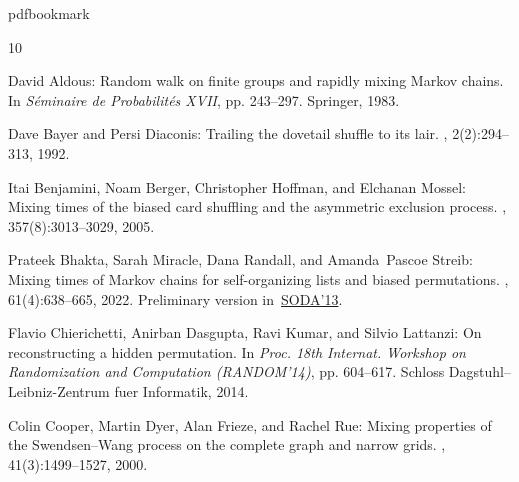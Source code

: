 \newcommand{\prelim}{Preliminary version in\ }\newcommand{\prelims}{Preliminary
  versions in\ }
\providecommand{\bibhead}[1]{}
\expandafter\ifx\csname pdfbookmark\endcsname\relax%
  \providecommand{\tocrefpdfbookmark}{}
\else\providecommand{\tocrefpdfbookmark}{%
   \hypertarget{tocreferences}{}%
   \pdfbookmark[1]{References}{tocreferences}}%
\fi

\tocrefpdfbookmark
\begin{thebibliography}{10}

\bibhead{ald}
{\sc David Aldous}: Random walk on finite groups and rapidly mixing {M}arkov
  chains.
\newblock In {\em S{\'e}minaire de Probabilit{\'e}s XVII}, pp. 243--297.
  Springer, 1983.

\bibhead{bd}
{\sc Dave Bayer and Persi Diaconis}: Trailing the dovetail shuffle to its lair.
, 2(2):294--313, 1992.

\bibhead{BBHM05}
{\sc Itai Benjamini, Noam Berger, Christopher Hoffman, and Elchanan Mossel}:
  Mixing times of the biased card shuffling and the asymmetric exclusion
  process.
, 357(8):3013--3029, 2005.
\newblock [\epfmtdoi{10.1090/S0002-9947-05-03610-X}]

\bibhead{bmrs}
{\sc Prateek Bhakta, Sarah Miracle, Dana Randall, and Amanda~Pascoe Streib}:
  Mixing times of {M}arkov chains for self-organizing lists and biased
  permutations.
, 61(4):638--665, 2022.
\newblock \prelim \href{https://doi.org/10.1137/1.9781611973105.1}{SODA'13}.

\bibhead{search}
{\sc Flavio Chierichetti, Anirban Dasgupta, Ravi Kumar, and Silvio Lattanzi}:
  On reconstructing a hidden permutation.
\newblock In {\em Proc. 18th Internat. Workshop on Randomization and
  Computation (RANDOM'14)}, pp. 604--617. Schloss Dagstuhl--Leibniz-Zentrum
  fuer Informatik, 2014.

\bibhead{CDF00}
{\sc Colin Cooper, Martin Dyer, Alan Frieze, and Rachel Rue}: Mixing properties
  of the {S}wendsen--{W}ang process on the complete graph and narrow grids.
, 41(3):1499--1527, 2000.
\newblock [\epfmtdoi{10.1063/1.533194}]


\end{thebibliography}
